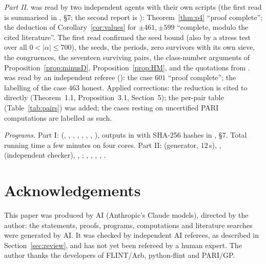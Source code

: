 \documentclass[11pt]{amsart}
\theoremstyle{definition}
\numberwithin{equation}{section}
\begin{document}
\emph{Part II.}  was read by two independent agents with their own scripts (the first read is summarised in , \S7; the second report is ): Theorem~\ref{thm:p4} ``proof complete''; the deduction of Corollary~\ref{cor:values} for $\pm461,\pm599$ ``complete, modulo the cited literature''. The first read confirmed the seed bound (also by a stress test over all $0<|\alpha|\le700$), the seeds, the periods, zero survivors with its own sieve, the congruences, the seventeen surviving pairs, the class-number arguments of Proposition~\ref{prop:minusD}, Proposition~\ref{prop:HM}, and the quotations from \cite{Goto,BCO,BCOT,BGPS,HM}.  was read by an independent referee (): the case $601$ ``proof complete''; the labelling of the case $463$ honest. Applied corrections: the reduction is cited to \cite{BCOT} directly (Theorem~1.1, Proposition~3.1, Section~5); the per-pair table (Table~\ref{tab:pairs}) was added; the cases resting on uncertified PARI computations are labelled as such.

\emph{Programs.} Part I:  (, , , , , , , ), outputs in  with SHA-256 hashes in , \S7. Total running time a few minutes on four cores. Part II:  (generator, $12$\,s), ,  (independent checker), , ; , , , , .

\section*{Acknowledgements}
This paper was produced by AI (Anthropic's Claude models), directed by the author: the statements, proofs, programs, computations and literature searches were generated by AI. It was checked by independent AI referees, as described in Section~\ref{sec:review}, and has not yet been refereed by a human expert. The author thanks the developers of FLINT/Arb, python-flint and PARI/GP.
\end{document}
